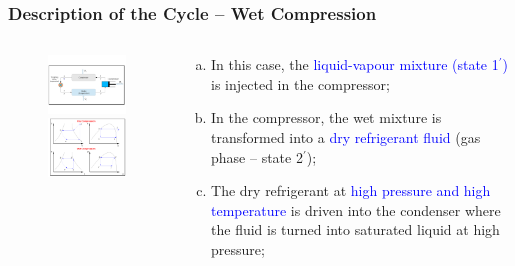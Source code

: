 \documentclass[10pt,compress]{beamer}
\begin{document}
\begin{frame}
 \frametitle{Description of the Cycle -- Wet Compression}
  \begin{columns}
   \begin{column}[c]{0.5\linewidth}
    \begin{figure}%
     \vbox{
      \includegraphics[width=5.5cm,clip]{./Pics/Overview_Refrig12}
      \vspace{-.5cm}
      \includegraphics[width=4.5cm,clip]{./Pics/Overview_Refrig13}}
    \end{figure}  
   \end{column}  
   \begin{column}[c]{0.5\linewidth}
  \begin{enumerate}[(a)]
   \item <1-> In this case, the \textcolor{blue}{liquid-vapour mixture (state 1$^{\prime}$)} is injected in the compressor;
   \item <2-> In the compressor, the wet mixture is transformed into a \textcolor{blue}{dry refrigerant fluid} (gas phase -- state 2$^{\prime}$);
   \item <3-> The dry refrigerant at \textcolor{blue}{high pressure and high temperature} is driven into the condenser where the fluid is turned into saturated liquid at high pressure;
  \end{enumerate}
 \end{column}  
\end{columns}
\end{frame}
\end{document}

